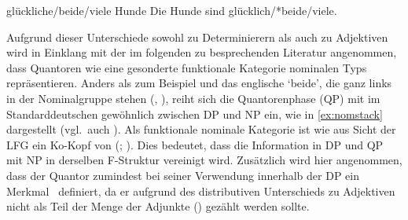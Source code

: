 \begin{exe}
\label{ex:beidedet}
\ex \begin{xlist}
		\label{ex:beidedet_1}
		\label{ex:beidedet_2}
		\label{ex:beidedet_3}
		\label{ex:beidedet_4}
\end{xlist}

\ex \begin{xlist}
	\ex glückliche/beide/viele Hunde
		\label{ex:beidepred_1}
	\ex Die Hunde sind glücklich/*beide/viele.
		\label{ex:beidepred_2}
\end{xlist}
\end{exe}

Aufgrund dieser Unterschiede sowohl zu  Determinierern als auch zu
Adjektiven wird in Einklang mit der im folgenden zu besprechenden Literatur
angenommen, dass Quantoren wie  eine gesonderte funktionale Kategorie
 nominalen Typs repräsentieren. Anders als zum Beispiel
 und das englische  `beide', die ganz links in der
Nominalgruppe stehen (, ), reiht sich die
Quantorenphase (QP) mit  im Standarddeutschen gewöhnlich zwischen DP
und NP ein, wie in \cref{ex:nomstack} dargestellt (vgl.~auch \cite[44--45 mit
Anm.~30]{lyons1999}).
Als funktionale nominale Kategorie ist  wie  aus Sicht der
LFG ein Ko-Kopf von  (; \cite[124]{bresnanetal2016}). Dies
bedeutet, dass die Information in DP und QP mit NP in derselben F-Struktur
vereinigt wird. Zusätzlich wird hier angenommen, dass der Quantor zumindest bei
seiner Verwendung innerhalb der DP ein Merkmal \Quant\ definiert, da er
aufgrund des distributiven Unterschieds zu Adjektiven nicht als Teil der Menge
der Adjunkte (\Adjc) gezählt werden sollte.

